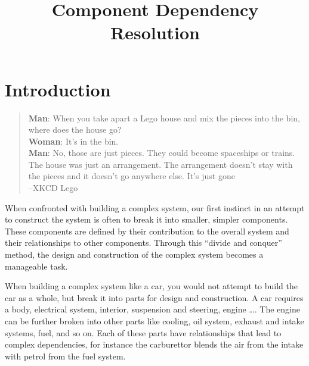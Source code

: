 \documentclass{report}
\title{Component Dependency Resolution}
\begin{document}

{}\tableofcontents

\chapter{Introduction}


\begin{quotation}
\textbf{Man}: When you take apart a Lego house and mix the pieces into the bin, where does the house go?\\
\textbf{Woman}: It's in the bin.\\
\textbf{Man}: No, those are just pieces. They could become spaceships or trains. 
The house was just an arrangement. The arrangement doesn't stay with the pieces and it doesn't go anywhere else. It's just gone\\
--XKCD Lego
\end{quotation}

{}When confronted with building a complex system, our first instinct in an attempt to construct the system is often to break it into smaller, simpler components. 
{}These components are defined by their contribution to the overall system and their relationships to other components.
{}Through this ``divide and conquer'' method, the design and construction of the complex system becomes a manageable task.

When building a complex system like a car, you would not attempt to build the car as a whole, but break it into parts for design and construction.
A car requires a body, electrical system, interior, suspension and steering, engine \ldots. 
The engine can be further broken into other parts like cooling, oil system, exhaust and intake systems, fuel, and so on.
Each of these parts have relationships that lead to complex dependencies, for instance the carburettor blends the air from the intake with petrol from the fuel system.
\end{document}
